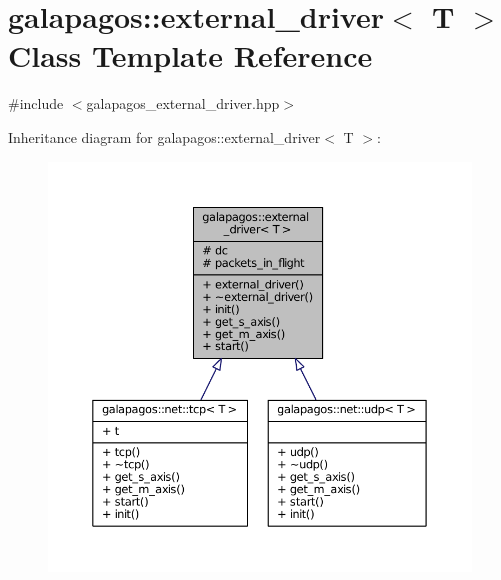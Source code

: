 \hypertarget{classgalapagos_1_1external__driver}{}\section{galapagos\+:\+:external\+\_\+driver$<$ T $>$ Class Template Reference}
\label{classgalapagos_1_1external__driver}


{\ttfamily \#include $<$galapagos\+\_\+external\+\_\+driver.\+hpp$>$}



Inheritance diagram for galapagos\+:\+:external\+\_\+driver$<$ T $>$\+:
\nopagebreak
\begin{figure}[H]
\begin{center}
\leavevmode
\includegraphics[width=350pt]{classgalapagos_1_1external__driver__inherit__graph}
\end{center}
\end{figure}



